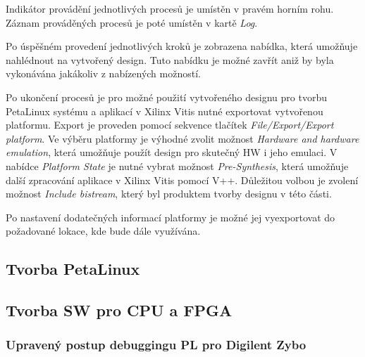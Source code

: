 \documentclass[a4paper, twoside, 11pt]{article}
\newcommand{\fbar}{\FloatBarrier}
\begin{document}
		Indikátor provádění jednotlivých procesů je umístěn v pravém horním rohu. Záznam prováděných procesů je poté umístěn v kartě \textit{Log}.\par
		Po úspěšném provedení jednotlivých kroků je zobrazena nabídka, která umožňuje nahlédnout na vytvořený design. Tuto nabídku je možné zavřít aniž by byla vykonávána jakákoliv z nabízených možností.\par
		Po ukončení procesů je pro možné použití vytvořeného designu pro tvorbu PetaLinux systému a aplikací v Xilinx Vitis nutné exportovat vytvořenou platformu. Export je proveden pomocí sekvence tlačítek \textit{File/Export/Export platform}. Ve výběru platformy je výhodné zvolit možnost \textit{Hardware and hardware emulation}, která umožňuje použít design pro skutečný HW i jeho emulaci. V nabídce \textit{Platform State} je nutné vybrat možnost \textit{Pre-Synthesis}, která umožňuje další zpracování aplikace v Xilinx Vitis pomocí V++. Důležitou volbou je zvolení možnost \textit{Include bistream}, který byl produktem tvorby designu v této části.\par
		Po nastavení dodatečných informací platformy je možné jej vyexportovat do požadované lokace, kde bude dále využívána.



	\fbar
	\subsection{Tvorba PetaLinux}
	\subsection{Tvorba SW pro CPU a FPGA}
	\subsubsection{Upravený postup debuggingu PL pro Digilent Zybo}
\end{document}

